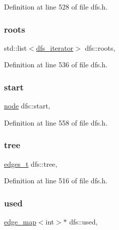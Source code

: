 Definition at line 528 of file dfs.\+h.

\mbox{\label{classdfs_a0bbd5cb8df26c891b74dadd84b46a06b}} 
\subsubsection{\texorpdfstring{roots}{roots}}
{\footnotesize\ttfamily std\+::list$<$\mbox{\hyperlink{classdfs_a15fe023a5a1f7ddda00f3d87110d9a32}{dfs\+\_\+iterator}}$>$ dfs\+::roots\hspace{0.3cm}{\ttfamily [protected]}, {\ttfamily [inherited]}}



Definition at line 536 of file dfs.\+h.

\mbox{\label{classdfs_af677cfc31fe06a18dd3a3aae7f7d112b}} 
\subsubsection{\texorpdfstring{start}{start}}
{\footnotesize\ttfamily \mbox{\hyperlink{classnode}{node}} dfs\+::start\hspace{0.3cm}{\ttfamily [protected]}, {\ttfamily [inherited]}}



Definition at line 558 of file dfs.\+h.

\mbox{\label{classdfs_aed496b618a937723bfec0b463e17e8d5}} 
\subsubsection{\texorpdfstring{tree}{tree}}
{\footnotesize\ttfamily \mbox{\hyperlink{edge_8h_a8f9587479bda6cf612c103494b3858e3}{edges\+\_\+t}} dfs\+::tree\hspace{0.3cm}{\ttfamily [protected]}, {\ttfamily [inherited]}}



Definition at line 516 of file dfs.\+h.

\mbox{\label{classdfs_afc18288747491be301d6d8d85d8f220b}} 
\subsubsection{\texorpdfstring{used}{used}}
{\footnotesize\ttfamily \mbox{\hyperlink{classedge__map}{edge\+\_\+map}}$<$int$>$$\ast$ dfs\+::used\hspace{0.3cm}{\ttfamily [protected]}, {\ttfamily [inherited]}}




